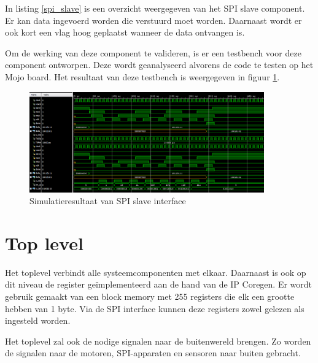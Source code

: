 
		\par In  listing \ref{spi_slave} is een overzicht weergegeven van het SPI slave component. Er kan data ingevoerd worden die verstuurd moet worden. Daarnaast wordt er ook kort een vlag hoog geplaatst wanneer de data ontvangen is.

			

		\par Om de werking van deze component te valideren, is er een testbench voor deze component ontworpen. Deze wordt geanalyseerd alvorens de code te testen op het Mojo board. Het resultaat van deze testbench is weergegeven in figuur \ref{spi_slave_tb}.

				\begin{figure}[H]					  
					  \centering
					  \includegraphics[width=0.9\textwidth]{Implementatie/spi_tb.png}
					  \caption{Simulatieresultaat van SPI slave interface}
					  \label{spi_slave_tb}
				\end{figure}

	\section{Top level}

		\par Het toplevel verbindt alle systeemcomponenten met elkaar. Daarnaast is ook op dit niveau de register ge\"implementeerd aan de hand van de IP Coregen. Er wordt gebruik gemaakt van een block memory met 255 registers die elk een grootte hebben van 1 byte. Via de SPI interface kunnen deze registers zowel gelezen als ingesteld worden.

		\par Het toplevel zal ook de nodige signalen naar de buitenwereld brengen. Zo worden de signalen naar de motoren, SPI-apparaten en sensoren naar buiten gebracht. 

